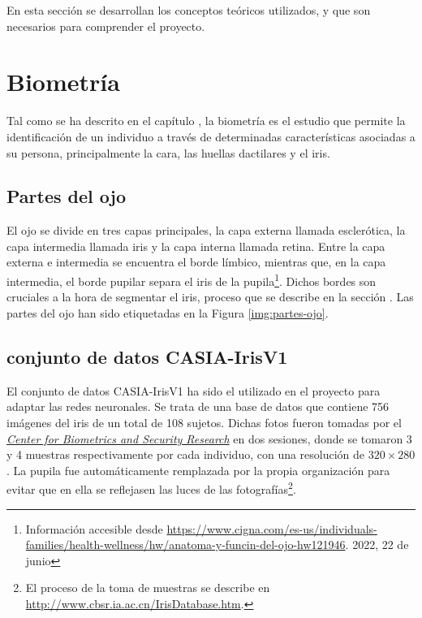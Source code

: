  \label{capitulo3}

En esta sección se desarrollan los conceptos teóricos utilizados, y que son necesarios para comprender el proyecto.

\section{Biometría}

Tal como se ha descrito en el capítulo , la biometría es el estudio que permite la identificación de un individuo a través de determinadas características asociadas a su persona, principalmente la cara, las huellas dactilares y el iris. 

\subsection{Partes del ojo} \label{partesojo} 

El ojo se divide en tres capas principales, la capa externa llamada esclerótica, la capa intermedia llamada iris y la capa interna llamada retina. Entre la capa externa e intermedia se encuentra el borde límbico, mientras que, en la capa intermedia, el borde pupilar separa el iris de la pupila\footnote{Información accesible desde \url{https://www.cigna.com/es-us/individuals-families/health-wellness/hw/anatoma-y-funcin-del-ojo-hw121946}. 2022, 22 de junio}.
Dichos bordes son cruciales a la hora de segmentar el iris, proceso que se describe en la sección .
Las partes del ojo han sido etiquetadas en la Figura \ref{img:partes-ojo}.


\subsection{conjunto de datos CASIA-IrisV1 }	\label{casia}

El conjunto de datos CASIA-IrisV1 ha sido el utilizado en el proyecto para adaptar las redes neuronales. Se trata de una base de datos que contiene 756 imágenes del iris de un total de 108 sujetos. 
Dichas fotos fueron tomadas por el \href{http://www.cbsr.ia.ac.cn/english/index.asp}{\textit{Center for Biometrics and Security Research}} en dos sesiones, donde se tomaron 3 y 4 muestras respectivamente por cada individuo, con una resolución de $320 \times 280$. 
La pupila fue automáticamente remplazada por la propia organización para evitar que en ella se reflejasen las luces de las fotografías\footnote{El proceso de la toma de muestras se describe en \url{http://www.cbsr.ia.ac.cn/IrisDatabase.htm}.}.

